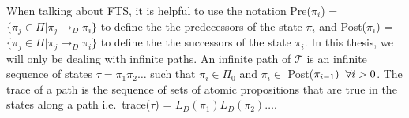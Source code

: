When talking about FTS, it is helpful to use the notation Pre($\pi_i$) = $\{\pi_j \in \Pi | \pi_j \rightarrow_D \pi_i\}$ to define the the predecessors of the state $\pi_i$ and Post($\pi_i$) = $\{\pi_j \in \Pi | \pi_j \rightarrow_D \pi_i\}$ to define the the successors of the state $\pi_i$. In this thesis, we will only be dealing with infinite paths. An infinite path of $\mathcal{T}$ is  an infinite sequence of states $\tau = \pi_1 \pi_2 \dots$ such that $\pi_i \in \Pi_0$ and $\pi_i \in $ Post($\pi_{i-1}) \hspace{0.2cm} \forall i > 0$. The trace of a path is the sequence of sets of atomic propositions that are true in the states along a path i.e.\ trace($\tau$) = $L_D(\pi_1)L_D(\pi_2) \dots$.  


